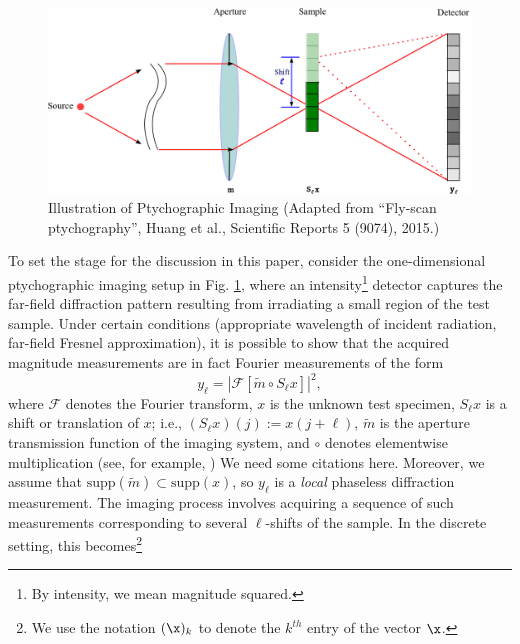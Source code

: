 %
\begin{figure}[hbtp]
    \includegraphics[scale=0.25]{pics/ptych1D}
    \caption{Illustration of Ptychographic Imaging {\small 
        (Adapted from ``Fly-scan ptychography'', Huang et al., 
        Scientific Reports 5 (9074), 2015.)} }
    \label{fig:ptychography_setup}
\end{figure}
%
To set the stage for the discussion in this paper, consider the
one-dimensional ptychographic imaging setup in Fig.
\ref{fig:ptychography_setup}, where an intensity\footnote{By intensity, we mean magnitude squared.} detector captures the
far-field diffraction pattern resulting from irradiating a small region
of the test sample. Under certain conditions (appropriate wavelength of
incident radiation, far-field Fresnel approximation), it is possible to
show that the acquired magnitude measurements are in fact Fourier
measurements of the form 
%
\begin{equation*}
    y_\ell = \left \vert \mathcal F [ \widetilde m \circ S_\ell x ]
       \right \vert^2,
\end{equation*}
%
where $\mathcal F$ denotes the Fourier transform, $x$ is the unknown
test specimen, $S_\ell x$ is a shift or translation of $x$; i.e.,
$(S_\ell x)(j) := x(j+\ell)$, $\widetilde m$ is the aperture
transmission function of the imaging system, and $\circ$ denotes elementwise multiplication (see, for example, \cite{}){\color{red} We need some citations here}. %
Moreover, we assume that $\text{supp}(\widetilde m) \subset \text{supp} (x)$, so $y_\ell$ is a  {\em local} phaseless diffraction
measurement. %
 The imaging process involves acquiring a sequence of such measurements
corresponding to several $\ell$-shifts of the sample. In the discrete setting, this becomes\footnote{We use the notation $(\x)_k$ to denote the
$k^{th}$ entry of the vector $\x$.} 
